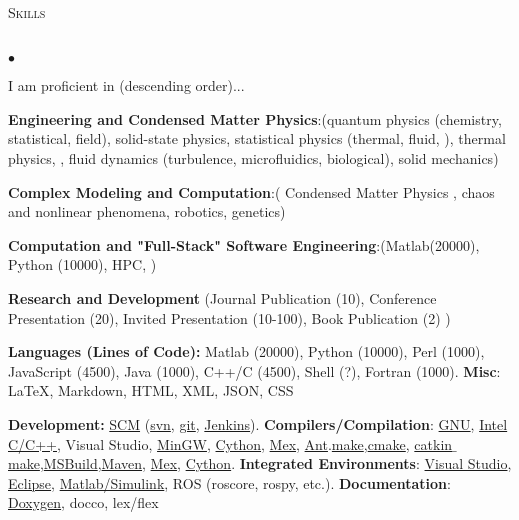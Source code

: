 \documentclass{article}
\newcommand{\lineunder}{\vspace*{-8pt} \\ \hspace*{-18pt} \hrulefill \\}
\newcommand{\header}[1]{{\hspace*{-15pt}\vspace*{6pt} \textsc{#1}} \vspace*{-6pt} \lineunder}
\newenvironment{achievements}{\begin{list}{$\bullet$}{\topsep 0pt \itemsep -2pt}}{\vspace*{4pt}\end{list}}
\begin{document}
\header{Skills}
\begin{achievements}

I am proficient in (descending order)...

\item \textbf{Engineering and Condensed Matter Physics}:(quantum physics (chemistry, statistical, field), solid-state physics, statistical physics (thermal, fluid,  ), thermal physics,  , fluid 
dynamics (turbulence,  microfluidics, biological), solid mechanics)

\item \textbf{Complex Modeling and Computation}:( Condensed Matter Physics , chaos and nonlinear phenomena,  robotics, genetics)

\item \textbf{Computation and "Full-Stack" Software Engineering}:(Matlab(20000), Python (10000),  HPC,  )

\item \textbf{Research and Development} (Journal Publication (10), Conference Presentation (20), Invited Presentation (10-100), Book 
Publication (2) )

\par
\item \textbf{Languages (Lines of Code): } Matlab (20000), Python (10000), Perl (1000), JavaScript (4500), Java (1000), C++/C (4500), Shell (?), Fortran (1000). \textbf{Misc}: \LaTeX, Markdown, HTML, XML, JSON, CSS

\item \textbf{Development:} \href{http://en.wikipedia.org/wiki/Software_configuration_management}{SCM} (\href{http://subversion.apache.org/}{svn}, \href{http://git-scm.com/}{git}, \href{http://jenkins-ci.org/}{Jenkins}). \textbf{Compilers/Compilation}: \href{http://gcc.gnu.org/}{GNU}, \href{https://software.intel.com/en-us/c-compilers}{Intel C/C++}, Visual Studio, \href{http://www.mingw.org/}{MinGW}, \href{http://cython.org/}{Cython}, \href{http://www.mathworks.com/help/matlab/ref/mex.html}{Mex}, \href{http://ant.apache.org/}{Ant}.\href{http://www.gnu.org/software/make/}{make},\href{http://www.cmake.org/}{cmake}, \href{http://wiki.ros.org/catkin/commands/catkin$\_$make}{catkin$\_$make},\href{http://en.wikipedia.org/wiki/MSBuild}{MSBuild},\href{http://maven.apache.org/}{Maven}, \href{http://www.mathworks.com/help/matlab/ref/mex.html}{Mex}, \href{http://cython.org/}{Cython}. \textbf{Integrated Environments}: \href{http://www.visualstudio.com/}{Visual Studio}, \href{http://www.eclipse.org/}{Eclipse}, \href{http://www.eclipse.org/}{Matlab/Simulink}, ROS (roscore, rospy, etc.). \textbf{Documentation}: \href{http://www.doxygen.org}{Doxygen}, docco, lex/flex


\end{achievements}
\end{document}
